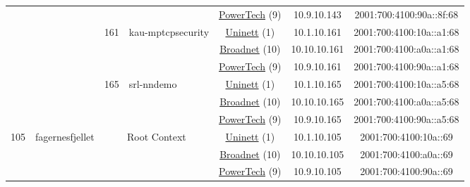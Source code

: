\begin{small}
\begin{center}
\begin{longtable}{|c|c|c|c|c|c|c|c|}
  &  &  &  & \multicolumn{2}{|c|}{\tiny{\href{http://www.powertech.no}{PowerTech} (9)}} & \tiny{10.9.10.143} & \tiny{2001:700:4100:90a::8f:68} \\* \cline{3-3}\cline{4-4}\cline{5-5}\cline{6-6}\cline{7-7}\cline{8-8}
  &  & \multirow{3}{*}{\tiny{161}} & \multicolumn{1}{|l|}{\multirow{3}{*}{\tiny{kau-mptcpsecurity}}} & \multicolumn{2}{|c|}{\tiny{\href{https://www.uninett.no}{Uninett} (1)}} & \tiny{10.1.10.161} & \tiny{2001:700:4100:10a::a1:68} \\* \cline{5-5}\cline{6-6}\cline{7-7}\cline{8-8}
  &  &  &  & \multicolumn{2}{|c|}{\tiny{\href{https://www.broadnet.no}{Broadnet} (10)}} & \tiny{10.10.10.161} & \tiny{2001:700:4100:a0a::a1:68} \\* \cline{5-5}\cline{6-6}\cline{7-7}\cline{8-8}
  &  &  &  & \multicolumn{2}{|c|}{\tiny{\href{http://www.powertech.no}{PowerTech} (9)}} & \tiny{10.9.10.161} & \tiny{2001:700:4100:90a::a1:68} \\* \cline{3-3}\cline{4-4}\cline{5-5}\cline{6-6}\cline{7-7}\cline{8-8}
  &  & \multirow{3}{*}{\tiny{165}} & \multicolumn{1}{|l|}{\multirow{3}{*}{\tiny{srl-nndemo}}} & \multicolumn{2}{|c|}{\tiny{\href{https://www.uninett.no}{Uninett} (1)}} & \tiny{10.1.10.165} & \tiny{2001:700:4100:10a::a5:68} \\* \cline{5-5}\cline{6-6}\cline{7-7}\cline{8-8}
  &  &  &  & \multicolumn{2}{|c|}{\tiny{\href{https://www.broadnet.no}{Broadnet} (10)}} & \tiny{10.10.10.165} & \tiny{2001:700:4100:a0a::a5:68} \\* \cline{5-5}\cline{6-6}\cline{7-7}\cline{8-8}
  &  &  &  & \multicolumn{2}{|c|}{\tiny{\href{http://www.powertech.no}{PowerTech} (9)}} & \tiny{10.9.10.165} & \tiny{2001:700:4100:90a::a5:68} \\ \hline
 \multirow{24}{*}{\tiny{105}} & \multicolumn{1}{|l|}{\multirow{24}{*}{\tiny{fagernesfjellet}}} & \multicolumn{2}{|c|}{\multirow{3}{*}{\tiny{Root Context}}} & \multicolumn{2}{|c|}{\tiny{\href{https://www.uninett.no}{Uninett} (1)}} & \tiny{10.1.10.105} & \tiny{2001:700:4100:10a::69} \\* \cline{5-5}\cline{6-6}\cline{7-7}\cline{8-8}
  &  & \multicolumn{2}{|c|}{} & \multicolumn{2}{|c|}{\tiny{\href{https://www.broadnet.no}{Broadnet} (10)}} & \tiny{10.10.10.105} & \tiny{2001:700:4100:a0a::69} \\* \cline{5-5}\cline{6-6}\cline{7-7}\cline{8-8}
  &  & \multicolumn{2}{|c|}{} & \multicolumn{2}{|c|}{\tiny{\href{http://www.powertech.no}{PowerTech} (9)}} & \tiny{10.9.10.105} & \tiny{2001:700:4100:90a::69} \\* \cline{3-3}\cline{4-4}\cline{5-5}\cline{6-6}\cline{7-7}\cline{8-8}

\end{longtable}
\end{center}
\end{small}
